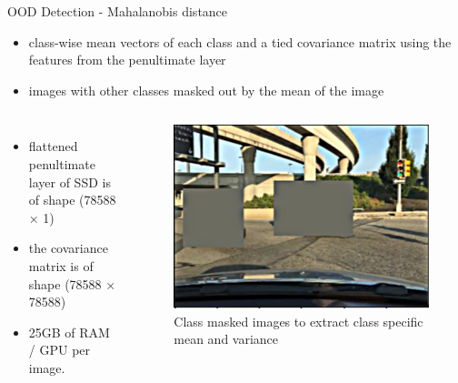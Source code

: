 \documentclass[10pt, aspectratio=169]{beamer}
\begin{document}
\begin{frame}[allowframebreaks]{OOD Detection - Mahalanobis distance}
    \begin{itemize}
        \item class-wise mean vectors of each class and a tied covariance matrix using the features from the penultimate layer
        \item images with other classes masked out by the mean of the image
    \end{itemize}
    \begin{columns}
            \begin{itemize}
                \item flattened penultimate layer of SSD is of shape (78588 × 1)
                \item the covariance matrix is of shape (78588 × 78588)
                \item 25GB of RAM / GPU per image.
            \end{itemize}
            \begin{figure}[!ht]
                \centering
                \includegraphics[scale=0.125]{images/rsz_1classspecific-image.png}
                \caption[SSD framework]{Class masked images to extract class specific mean and variance}
            \end{figure}
    \end{columns}
\end{frame}
\end{document}
